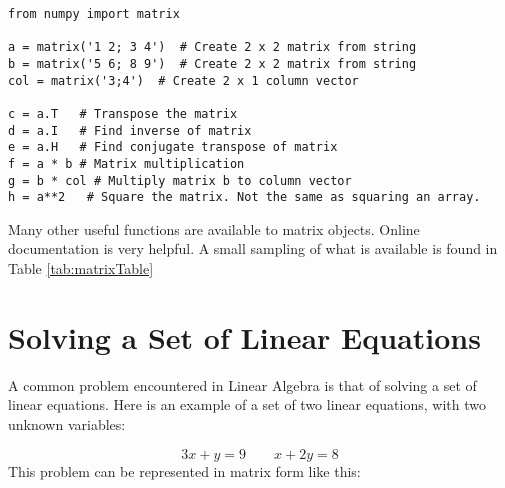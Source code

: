 \begin{Verbatim}
from numpy import matrix

a = matrix('1 2; 3 4')  # Create 2 x 2 matrix from string
b = matrix('5 6; 8 9')  # Create 2 x 2 matrix from string
col = matrix('3;4')  # Create 2 x 1 column vector

c = a.T   # Transpose the matrix
d = a.I   # Find inverse of matrix
e = a.H   # Find conjugate transpose of matrix
f = a * b # Matrix multiplication
g = b * col # Multiply matrix b to column vector
h = a**2   # Square the matrix. Not the same as squaring an array.
\end{Verbatim}
 Many other useful functions are available to matrix objects.  Online
 documentation is very helpful.  A small sampling of what is available
 is found in Table \ref{tab:matrixTable}

\section{Solving a Set of Linear Equations}
A common problem encountered in Linear Algebra is that of solving a
set of linear equations.  Here is an example of a set of two linear
equations, with two unknown variables:

\begin{equation}
3 x + y = 9\qquad
x + 2 y = 8
\end{equation}
This problem can be represented
in matrix form like this:

